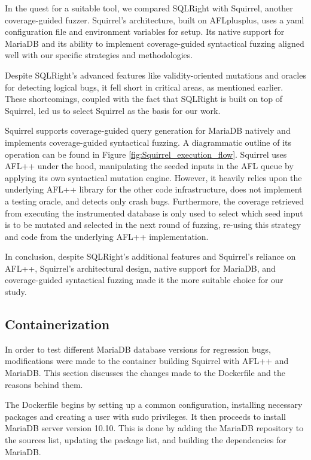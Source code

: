 \documentclass[sigconf]{acmart}
\begin{document}

In the quest for a suitable tool, we compared SQLRight with Squirrel, another coverage-guided fuzzer. Squirrel's architecture, built on AFLplusplus, uses a yaml configuration file and environment variables for setup. Its native support for MariaDB and its ability to implement coverage-guided syntactical fuzzing aligned well with our specific strategies and methodologies.

Despite SQLRight's advanced features like validity-oriented mutations and oracles for detecting logical bugs, it fell short in critical areas, as mentioned earlier. These shortcomings, coupled with the fact that SQLRight is built on top of Squirrel, led us to select Squirrel as the basis for our work.

Squirrel supports coverage-guided query generation for MariaDB natively and implements coverage-guided syntactical fuzzing. A diagrammatic outline of its operation can be found in Figure \ref{fig:Squirrel_execution_flow}. Squirrel uses AFL++ under the hood, manipulating the seeded inputs in the AFL queue by applying its own syntactical mutation engine. However, it heavily relies upon the underlying AFL++ library for the other code infrastructure, does not implement a testing oracle, and detects only crash bugs. Furthermore, the coverage retrieved from executing the instrumented database is only used to select which seed input is to be mutated and selected in the next round of fuzzing, re-using this strategy and code from the underlying AFL++ implementation.

In conclusion, despite SQLRight's additional features and Squirrel's reliance on AFL++, Squirrel's architectural design, native support for MariaDB, and coverage-guided syntactical fuzzing made it the more suitable choice for our study.

\subsection{Containerization}

In order to test different MariaDB database versions for regression bugs, modifications were made to the container building Squirrel with AFL++ and MariaDB. This section discusses the changes made to the Dockerfile and the reasons behind them.

The Dockerfile begins by setting up a common configuration, installing necessary packages and creating a user with sudo privileges. It then proceeds to install MariaDB server version 10.10. This is done by adding the MariaDB repository to the sources list, updating the package list, and building the dependencies for MariaDB.
\end{document}
